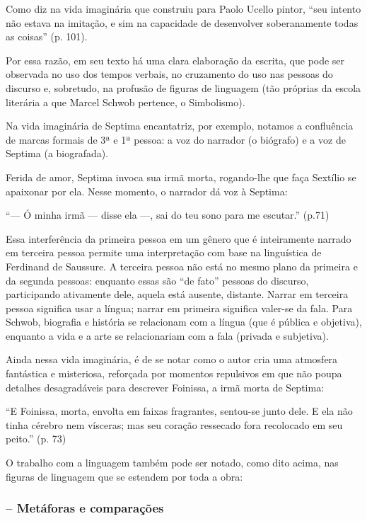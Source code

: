 \documentclass[12pt]{extarticle}
\begin{document}
Como diz na vida imaginária que construiu para Paolo Ucello pintor,
``seu intento não estava na imitação, e sim na capacidade de desenvolver
soberanamente todas as coisas'' (p. 101).

Por essa razão, em seu texto há uma clara elaboração da escrita, que
pode ser observada no uso dos tempos verbais, no cruzamento do uso nas
pessoas do discurso e, sobretudo, na profusão de figuras de linguagem
(tão próprias da escola literária a que Marcel Schwob pertence, o
Simbolismo).

Na vida imaginária de Septima encantatriz, por exemplo, notamos a
confluência de marcas formais de 3ª e 1ª pessoa: a voz do narrador (o
biógrafo) e a voz de Septima (a biografada).

Ferida de amor, Septima invoca sua irmã morta, rogando-lhe que faça
Sextílio se apaixonar por ela. Nesse momento, o narrador dá voz à
Septima:

``--- Ó minha irmã --- disse ela ---, sai do teu sono para me escutar.''
(p.71)

Essa interferência da primeira pessoa em um gênero que é inteiramente
narrado em terceira pessoa permite uma interpretação com base na
linguística de Ferdinand de Saussure. A terceira pessoa não está no
mesmo plano da primeira e da segunda pessoas: enquanto essas são ``de
fato'' pessoas do discurso, participando ativamente dele, aquela está
ausente, distante. Narrar em terceira pessoa significa usar a língua;
narrar em primeira significa valer-se da fala. Para Schwob, biografia e
história se relacionam com a língua (que é pública e objetiva), enquanto
a vida e a arte se relacionariam com a fala (privada e subjetiva).

Ainda nessa vida imaginária, é de se notar como o autor cria uma
atmosfera fantástica e misteriosa, reforçada por momentos repulsivos em
que não poupa detalhes desagradáveis para descrever Foinissa, a irmã
morta de Septima:

``E Foinissa, morta, envolta em faixas fragrantes, sentou-se junto dele.
E ela não tinha cérebro nem vísceras; mas seu coração ressecado fora
recolocado em seu peito.'' (p. 73)

O trabalho com a linguagem também pode ser notado, como dito acima, nas
figuras de linguagem que se estendem por toda a obra:


\subsubsection{-- Metáforas e comparações}
\end{document}
